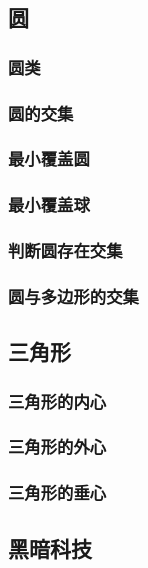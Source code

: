 \documentclass[a4paper]{article}
\begin{document}
\subsection{圆}

\subsubsection{圆类}

\subsubsection{圆的交集}

\subsubsection{最小覆盖圆}

\subsubsection{最小覆盖球}

\subsubsection{判断圆存在交集}

\subsubsection{圆与多边形的交集}

\subsection{三角形}

\subsubsection{三角形的内心}

\subsubsection{三角形的外心}

\subsubsection{三角形的垂心}

\subsection{黑暗科技}
\end{document}
